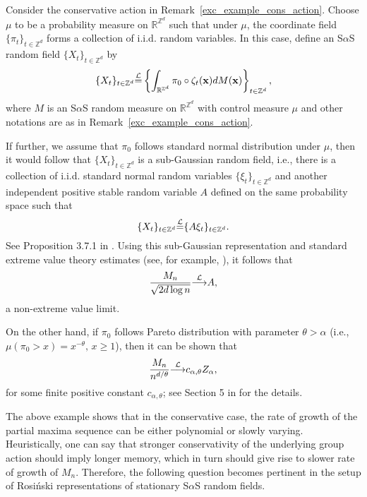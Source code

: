 \documentclass[12pt]{amsart}
\begin{document}
\begin{example} \textnormal{Consider the conservative action in Remark~\ref{exc_example_cons_action}. Choose $\mu$ to be a probability measure on $\mathbb{R}^{\mathbb{Z}^d}$ such that under $\mu$, the coordinate field $\{\pi_t\}_{t \in {\mathbb{Z}^d}}$ forms a collection of i.i.d. random variables. In this case, define an S$\alpha$S random field ${\{X_t\}_{t \in \mathbb{Z}^d}}$ by}
\[
\{X_t\}_{t \in {\mathbb{Z}^d}} {\stackrel{\footnotesize{\mathcal{L}}}{=}} \left\{\int_{\mathbb{R}^{\mathbb{Z}^d}} \pi_0 \circ \zeta_t ({{\bf x}}) dM({{\bf x}})\right\}_{t \in {\mathbb{Z}^d}},
\]
\textnormal{where $M$ is an S$\alpha$S random measure on $\mathbb{R}^{\mathbb{Z}^d}$ with control measure $\mu$ and other notations are as in Remark~\ref{exc_example_cons_action}.}

\textnormal{If further, we assume that $\pi_0$ follows standard normal distribution under $\mu$, then it would follow that ${\{X_t\}_{t \in \mathbb{Z}^d}}$ is a sub-Gaussian random field, i.e., there is a collection of i.i.d. standard normal random variables $\{\xi_t\}_{t \in {\mathbb{Z}^d}}$ and another independent positive stable random variable $A$ defined on the same probability space such that}
\[
\{X_t\}_{t \in {\mathbb{Z}^d}} {\stackrel{\footnotesize{\mathcal{L}}}{=}} \{A\xi_t\}_{t \in {\mathbb{Z}^d}}.
\]
\textnormal{See Proposition 3.7.1 in \cite{samorodnitsky:taqqu:1994}. Using this sub-Gaussian representation and standard extreme value theory estimates (see, for example, \cite{resnick:1987}), it follows that}
\[
\frac{M_n}{\sqrt{2d\log{n}}} {\stackrel{\footnotesize{\mathcal{L}}}{\longrightarrow}} A,
\]
\textnormal{a non-extreme value limit.}

\textnormal{On the other hand, if $\pi_0$ follows Pareto distribution with parameter $\theta > \alpha$ (i.e., $\mu(\pi_0>x)=x^{-\theta},\,x \geq 1$), then it can be shown that}
\[
\frac{M_n}{n^{d/\theta}} {\stackrel{\footnotesize{\mathcal{L}}}{\longrightarrow}} c_{\alpha, \theta} Z_\alpha,
\]
\textnormal{for some finite positive constant $c_{\alpha, \theta}$; see Section 5 in \cite{samorodnitsky:2004a} for the details.}
\end{example}

The above example shows that in the conservative case, the rate of growth of the partial maxima sequence can be either polynomial or slowly varying. Heuristically, one can say that stronger conservativity of the underlying group action should imply longer memory, which in turn should give rise to slower rate of growth of $M_n$. Therefore, the following question becomes pertinent in the setup of Rosi\'{n}ski representations of stationary S$\alpha$S random fields.
\end{document}
